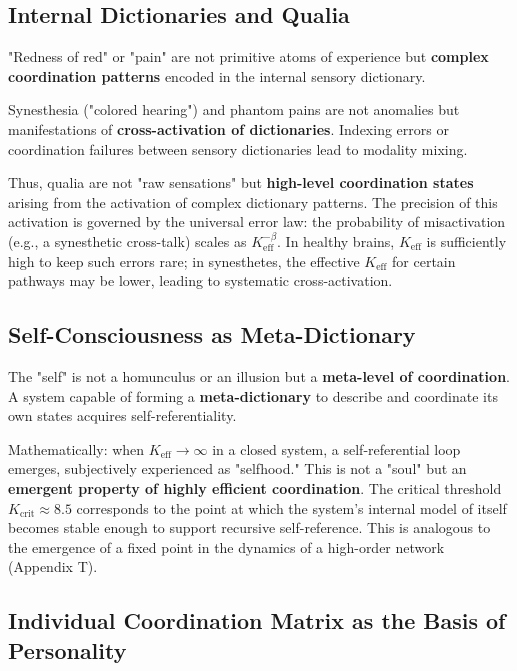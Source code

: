 \documentclass[12pt,a4paper]{article}
\newcommand{\eff}{\mathrm{eff}}
\newcommand{\Ke}{K_{\eff}}
\newcommand{\Kcrit}{K_{\mathrm{crit}}}
\begin{document}
	\subsection{Internal Dictionaries and Qualia}
	
	"Redness of red" or "pain" are not primitive atoms of experience but \textbf{complex coordination patterns} encoded in the internal sensory dictionary.
	
	\begin{tcolorbox}[title=Example: Synesthesia and Phantom Pains]
		Synesthesia ("colored hearing") and phantom pains are not anomalies but manifestations of \textbf{cross-activation of dictionaries}. Indexing errors or coordination failures between sensory dictionaries lead to modality mixing.
	\end{tcolorbox}
	
	Thus, qualia are not "raw sensations" but \textbf{high-level coordination states} arising from the activation of complex dictionary patterns. The precision of this activation is governed by the universal error law: the probability of misactivation (e.g., a synesthetic cross-talk) scales as $\Ke^{-\beta}$. In healthy brains, $\Ke$ is sufficiently high to keep such errors rare; in synesthetes, the effective $\Ke$ for certain pathways may be lower, leading to systematic cross-activation.
	
	\subsection{Self-Consciousness as Meta-Dictionary}
	
	The "self" is not a homunculus or an illusion but a \textbf{meta-level of coordination}. A system capable of forming a \textbf{meta-dictionary} to describe and coordinate its own states acquires self-referentiality.
	
	Mathematically: when $\Ke \to \infty$ in a closed system, a self-referential loop emerges, subjectively experienced as "selfhood." This is not a "soul" but an \textbf{emergent property of highly efficient coordination}. The critical threshold $\Kcrit \approx 8.5$ corresponds to the point at which the system's internal model of itself becomes stable enough to support recursive self-reference. This is analogous to the emergence of a fixed point in the dynamics of a high-order network (Appendix T).
	
	\subsection{Individual Coordination Matrix as the Basis of Personality}
	\label{subsec:personality-matrix}
	
\end{document}
